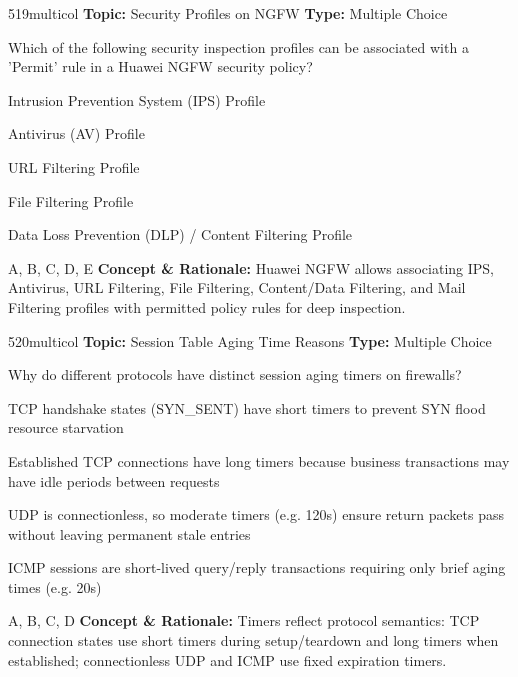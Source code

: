 \begin{qcard}{519}{multicol}
\textcolor{darkslate!75}{\small\textbf{Topic:} Security Profiles on NGFW \hfill \textbf{Type:} Multiple Choice}\vspace{0.4em}\par
Which of the following security inspection profiles can be associated with a 'Permit' rule in a Huawei NGFW security policy?
\begin{qoptions}
\item Intrusion Prevention System (IPS) Profile
\item Antivirus (AV) Profile
\item URL Filtering Profile
\item File Filtering Profile
\item Data Loss Prevention (DLP) / Content Filtering Profile
\end{qoptions}
\end{qcard}
\nopagebreak
\begin{explainbox}{A, B, C, D, E}
\textbf{Concept \& Rationale:} Huawei NGFW allows associating IPS, Antivirus, URL Filtering, File Filtering, Content/Data Filtering, and Mail Filtering profiles with permitted policy rules for deep inspection.
\end{explainbox}

\begin{qcard}{520}{multicol}
\textcolor{darkslate!75}{\small\textbf{Topic:} Session Table Aging Time Reasons \hfill \textbf{Type:} Multiple Choice}\vspace{0.4em}\par
Why do different protocols have distinct session aging timers on firewalls?
\begin{qoptions}
\item TCP handshake states (SYN\_SENT) have short timers to prevent SYN flood resource starvation
\item Established TCP connections have long timers because business transactions may have idle periods between requests
\item UDP is connectionless, so moderate timers (e.g. 120s) ensure return packets pass without leaving permanent stale entries
\item ICMP sessions are short-lived query/reply transactions requiring only brief aging times (e.g. 20s)
\end{qoptions}
\end{qcard}
\nopagebreak
\begin{explainbox}{A, B, C, D}
\textbf{Concept \& Rationale:} Timers reflect protocol semantics: TCP connection states use short timers during setup/teardown and long timers when established; connectionless UDP and ICMP use fixed expiration timers.
\end{explainbox}

